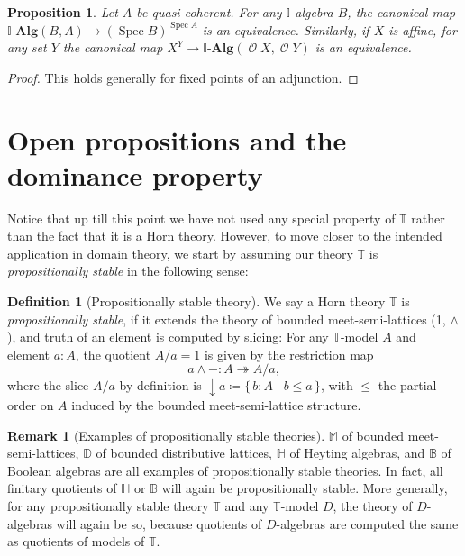\documentclass[a4paper,12pt]{amsart}
\newtheorem{proposition}[theorem]{Proposition}
\theoremstyle{definition}
\newtheorem{definition}[theorem]{Definition}
\newtheorem{remark}[theorem]{Remark}
\newcommand{\mc}[1]{\mathcal{#1}}
\newcommand{\mb}[1]{\mathbf{#1}}
\newcommand{\mbb}[1]{\mathbb{#1}}
\newcommand{\T}{\mbb T}
\newcommand{\I}{\mbb I}
\newcommand{\alg}{\text{-}\mb{Alg}}
\newcommand{\scomp}[2]{\{\,#1\mid#2\,\}}
\newcommand{\surj}{\twoheadrightarrow}
\newcommand{\cv}{\operatorname{\downarrow}}
\newcommand{\spec}{\operatorname{Spec}}
\newcommand{\opens}{\operatorname{\mc{O}}} %
\begin{document}
\begin{proposition}\label{prop:duality}
  Let $A$ be quasi-coherent. For any $\I$-algebra $B$, the canonical map $\I\alg(B,A) \to (\spec B)^{\spec A}$ is an equivalence. Similarly, if $X$ is affine, for any set $Y$ the canonical map $X^Y \to \I\alg(\opens X,\opens Y)$ is an equivalence.
\end{proposition}
\begin{proof}
  This holds generally for fixed points of an adjunction.
\end{proof}


\section{Open propositions and the dominance property}\label{sec:dominance}

Notice that up till this point we have not used any special property of $\T$ rather than the fact that it is a Horn theory. However, to move closer to the intended application in domain theory, we start by assuming our theory $\T$ is \emph{propositionally stable} in the following sense: 

\begin{definition}[Propositionally stable theory]\label{defn:propositional}
  We say a Horn theory $\T$ is \emph{propositionally stable}, if it extends the theory of bounded meet-semi-lattices (1, $\wedge$), and truth of an element is computed by slicing: For any $\T$-model $A$ and element $a:A$, the quotient $A/a=1$ is given by the restriction map
  \[ a \wedge - : A \surj A/a, \]
  where the slice $A/a$ by definition is ${\cv} a \coloneq \scomp{b:A}{b\le a}$, with $\le$ the partial order on $A$ induced by the bounded meet-semi-lattice structure.
\end{definition}


\begin{remark}[Examples of propositionally stable theories]
  $\mbb M$ of bounded meet-semi-lattices, $\mbb D$ of bounded distributive lattices, $\mbb H$ of Heyting algebras, and $\mbb B$ of Boolean algebras are all examples of propositionally stable theories. In fact, all finitary quotients of $\mbb H$ or $\mbb B$ will again be propositionally stable. More generally, for any propositionally stable theory $\T$ and any $\T$-model $D$, the theory of $D$-algebras will again be so, because quotients of $D$-algebras are computed the same as quotients of models of $\T$.
\end{remark}
\end{document}

